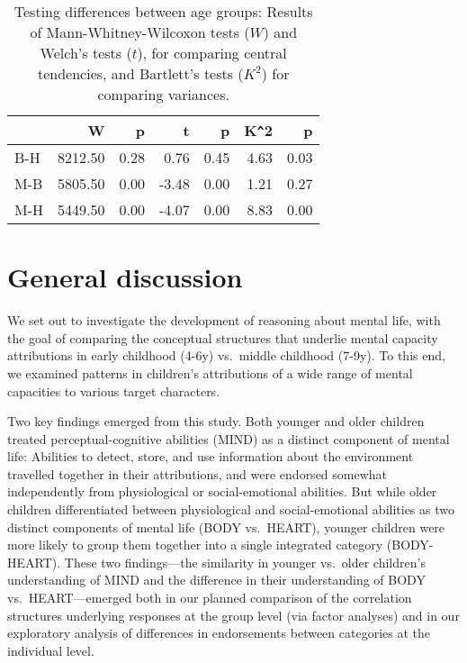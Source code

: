 \documentclass[10pt, letterpaper]{article}
\begin{document}
\begin{table}[ht]
\centering
\begin{tabular}{l|rr|rr|rr}
  \hline
 & W & p & t & p & K\verb|^|2 & p \\ 
  \hline
B-H & 8212.50 & 0.28 &  0.76 & 0.45 & 4.63 & 0.03 \\ 
  M-B & 5805.50 & 0.00 & -3.48 & 0.00 & 1.21 & 0.27 \\ 
  M-H & 5449.50 & 0.00 & -4.07 & 0.00 & 8.83 & 0.00 \\ 
   \hline
\end{tabular}
\caption{Testing differences between age groups: Results of Mann-Whitney-Wilcoxon tests ($  {W}$) and Welch's tests ($  {t}$), for comparing central tendencies, and Bartlett's tests ($    {K^2}$) for comparing variances.} 
\end{table}

\section{General discussion}\label{general-discussion}

We set out to investigate the development of reasoning about mental
life, with the goal of comparing the conceptual structures that underlie
mental capacity attributions in early childhood (4-6y) vs.~middle
childhood (7-9y). To this end, we examined patterns in children's
attributions of a wide range of mental capacities to various target
characters.

Two key findings emerged from this study. Both younger and older
children treated perceptual-cognitive abilities (MIND) as a distinct
component of mental life: Abilities to detect, store, and use
information about the environment travelled together in their
attributions, and were endorsed somewhat independently from
physiological or social-emotional abilities. But while older children
differentiated between physiological and social-emotional abilities as
two distinct components of mental life (BODY vs.~HEART), younger
children were more likely to group them together into a single
integrated category (BODY-HEART). These two findings---the similarity in
younger vs.~older children's understanding of MIND and the difference in
their understanding of BODY vs.~HEART---emerged both in our planned
comparison of the correlation structures underlying responses at the
group level (via factor analyses) and in our exploratory analysis of
differences in endorsements between categories at the individual level.
\end{document}
